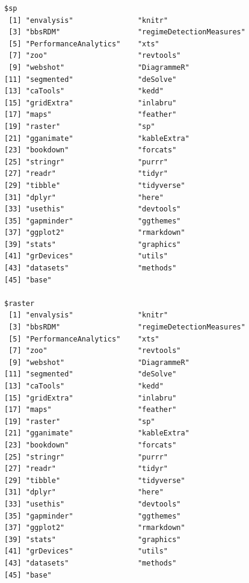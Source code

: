 \documentclass[12pt,twoside,openany]{reedthesis}
\begin{document}
\begin{verbatim}
$sp
 [1] "envalysis"               "knitr"                  
 [3] "bbsRDM"                  "regimeDetectionMeasures"
 [5] "PerformanceAnalytics"    "xts"                    
 [7] "zoo"                     "revtools"               
 [9] "webshot"                 "DiagrammeR"             
[11] "segmented"               "deSolve"                
[13] "caTools"                 "kedd"                   
[15] "gridExtra"               "inlabru"                
[17] "maps"                    "feather"                
[19] "raster"                  "sp"                     
[21] "gganimate"               "kableExtra"             
[23] "bookdown"                "forcats"                
[25] "stringr"                 "purrr"                  
[27] "readr"                   "tidyr"                  
[29] "tibble"                  "tidyverse"              
[31] "dplyr"                   "here"                   
[33] "usethis"                 "devtools"               
[35] "gapminder"               "ggthemes"               
[37] "ggplot2"                 "rmarkdown"              
[39] "stats"                   "graphics"               
[41] "grDevices"               "utils"                  
[43] "datasets"                "methods"                
[45] "base"                   

$raster
 [1] "envalysis"               "knitr"                  
 [3] "bbsRDM"                  "regimeDetectionMeasures"
 [5] "PerformanceAnalytics"    "xts"                    
 [7] "zoo"                     "revtools"               
 [9] "webshot"                 "DiagrammeR"             
[11] "segmented"               "deSolve"                
[13] "caTools"                 "kedd"                   
[15] "gridExtra"               "inlabru"                
[17] "maps"                    "feather"                
[19] "raster"                  "sp"                     
[21] "gganimate"               "kableExtra"             
[23] "bookdown"                "forcats"                
[25] "stringr"                 "purrr"                  
[27] "readr"                   "tidyr"                  
[29] "tibble"                  "tidyverse"              
[31] "dplyr"                   "here"                   
[33] "usethis"                 "devtools"               
[35] "gapminder"               "ggthemes"               
[37] "ggplot2"                 "rmarkdown"              
[39] "stats"                   "graphics"               
[41] "grDevices"               "utils"                  
[43] "datasets"                "methods"                
[45] "base"                   


\end{verbatim}
\end{document}
